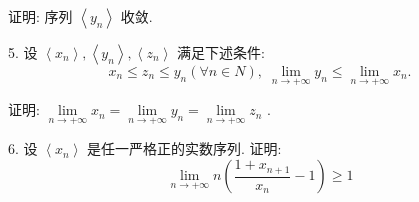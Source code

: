 证明: 序列 $\left\langle  {y}_{n}\right\rangle$ 收敛.

5. 设 $\left\langle  {x}_{n}\right\rangle  ,\left\langle  {y}_{n}\right\rangle  ,\left\langle  {z}_{n}\right\rangle$ 满足下述条件:
$${x}_{n} \leq  {z}_{n} \leq  {y}_{n}\left( {\forall n \in  N}\right) ,\;\mathop{\lim }\limits_{{n \rightarrow   + \infty }}{y}_{n} \leq  \mathop{\lim }\limits_{{n \rightarrow   + \infty }}{x}_{n}.$$

证明: $\mathop{\lim }\limits_{{n \rightarrow   + \infty }}{x}_{n} = \mathop{\lim }\limits_{{n \rightarrow   + \infty }}{y}_{n} = \mathop{\lim }\limits_{{n \rightarrow   + \infty }}{z}_{n}$ .

6. 设 $\left\langle  {x}_{n}\right\rangle$ 是任一严格正的实数序列. 证明:
$$\mathop{\lim }\limits_{{n \rightarrow   + \infty }}n\left( {\frac{1 + {x}_{n + 1}}{{x}_{n}} - 1}\right)  \geq  1$$

